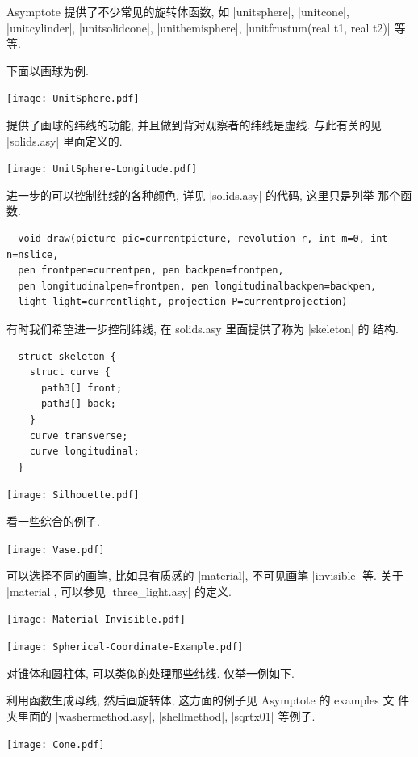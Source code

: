 \documentclass{ctexbook}
\begin{document}
Asymptote 提供了不少常见的旋转体函数, 如 |unitsphere|, |unitcone|,
|unitcylinder|, |unitsolidcone|, |unithemisphere|,
|unitfrustum(real t1, real t2)| 等等.

下面以画球为例.
\begin{center}\texttt{[image: UnitSphere.pdf]}\end{center}%

提供了画球的纬线的功能, 并且做到背对观察者的纬线是虚线.
与此有关的见 |solids.asy| 里面定义的.
\begin{center}\texttt{[image: UnitSphere-Longitude.pdf]}\end{center}%

进一步的可以控制纬线的各种颜色, 详见 |solids.asy| 的代码, 这里只是列举
那个函数.
\begin{lstlisting}
  void draw(picture pic=currentpicture, revolution r, int m=0, int n=nslice,
  pen frontpen=currentpen, pen backpen=frontpen,
  pen longitudinalpen=frontpen, pen longitudinalbackpen=backpen,
  light light=currentlight, projection P=currentprojection)
\end{lstlisting}
有时我们希望进一步控制纬线, 在 solids.asy 里面提供了称为 |skeleton| 的
结构.
\begin{lstlisting}
  struct skeleton {
    struct curve {
      path3[] front;
      path3[] back;
    }
    curve transverse;
    curve longitudinal;
  }
\end{lstlisting}
\begin{center}\texttt{[image: Silhouette.pdf]}\end{center}%

看一些综合的例子.
\begin{center}\texttt{[image: Vase.pdf]}\end{center}%

可以选择不同的画笔, 比如具有质感的 |material|, 不可见画笔 |invisible|
等. 关于 |material|, 可以参见 |three_light.asy| 的定义.
\begin{center}\texttt{[image: Material-Invisible.pdf]}\end{center}%

\begin{center}\texttt{[image: Spherical-Coordinate-Example.pdf]}\end{center}%

对锥体和圆柱体, 可以类似的处理那些纬线. 仅举一例如下.

利用函数生成母线, 然后画旋转体, 这方面的例子见 Asymptote 的 examples 文
件夹里面的 |washermethod.asy|, |shellmethod|, |sqrtx01| 等例子.
\begin{center}\texttt{[image: Cone.pdf]}\end{center}%

\end{document}
